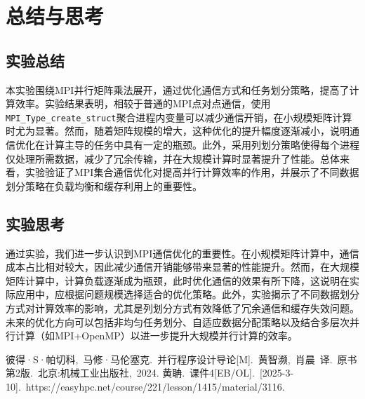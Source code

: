 \documentclass[a4paper, utf8]{ctexart}
\begin{document}
	\section{总结与思考}
	
	\subsection{实验总结}
	
	本实验围绕MPI并行矩阵乘法展开，通过优化通信方式和任务划分策略，提高了计算效率。实验结果表明，相较于普通的MPI点对点通信，使用\verb|MPI_Type_create_struct|聚合进程内变量可以减少通信开销，在小规模矩阵计算时尤为显著。然而，随着矩阵规模的增大，这种优化的提升幅度逐渐减小，说明通信优化在计算主导的任务中具有一定的瓶颈。此外，采用列划分策略使得每个进程仅处理所需数据，减少了冗余传输，并在大规模计算时显著提升了性能。总体来看，实验验证了MPI集合通信优化对提高并行计算效率的作用，并展示了不同数据划分策略在负载均衡和缓存利用上的重要性。
	
	\subsection{实验思考}
	
	通过实验，我们进一步认识到MPI通信优化的重要性。在小规模矩阵计算中，通信成本占比相对较大，因此减少通信开销能够带来显著的性能提升。然而，在大规模矩阵计算中，计算负载逐渐成为瓶颈，此时优化通信的效果有所下降，这说明在实际应用中，应根据问题规模选择适合的优化策略。此外，实验揭示了不同数据划分方式对计算效率的影响，尤其是列划分方式有效降低了冗余通信和缓存失效问题。未来的优化方向可以包括非均匀任务划分、自适应数据分配策略以及结合多层次并行计算（如MPI+OpenMP）以进一步提升大规模并行计算的效率。
	
	\let\cleardoublepage\clearpage
	
	\begin{thebibliography}{99}  
		 彼得·S·帕切科,\ 马修·马伦塞克.\ 并行程序设计导论[M].\ 黄智濒,\ 肖晨\ 译.\ 原书第2版.\ 北京:机械工业出版社,\ 2024.
		 黄聃.\ 课件4[EB/OL].\ [2025-3-10].\ https://easyhpc.net/course/221/lesson/1415/material/3116.
	\end{thebibliography}
	
\end{document}
